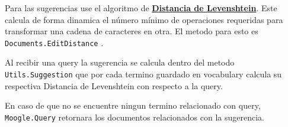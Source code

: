 \documentclass[10pt,a4paper]{report}
\begin{document}
\begin{flushleft}
    \begin{flushleft}
    
    Para las sugerencias use el algoritmo de \textbf{\href{https://es.wikipedia.org/wiki/Distancia_de_Levenshtein}{Distancia de Levenshtein}}. Este calcula de forma dinamica el número mínimo de operaciones requeridas para transformar una cadena de caracteres en otra. El metodo para esto es \texttt{Documents.EditDistance} .

    Al recibir una query la sugerencia se calcula dentro del metodo \texttt{Utils.Suggestion} que por cada termino guardado en vocabulary calcula su respectiva Distancia de Levenshtein con respecto a la query.

    En caso de que no se encuentre ningun termino relacionado con query, \texttt{Moogle.Query} retornara los documentos relacionados con la sugerencia.

    \end{flushleft}

\end{flushleft}
\end{document}

